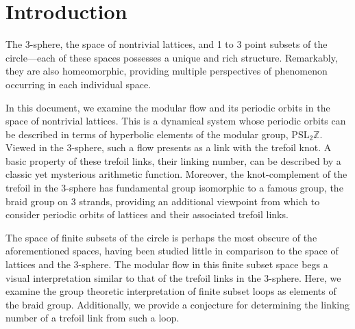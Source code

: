 \documentclass[12pt,twoside]{reedthesis}
\title{}
\author{}
\date{}
\theoremstyle{definition}
\newcommand{\Z}{\mathbb{Z}}
\newcommand{\PSLZ}{\mathrm{PSL}_2{\Z}}
\begin{document}
\maketitle
\setlength{\parskip}{0pt}
\frontmatter
\pagestyle{empty}


\tableofcontents


\setlength{\parskip}{1em}
\mainmatter
\pagestyle{fancyplain}

\chapter*{Introduction}

The 3-sphere, the space of nontrivial lattices, and 1 to 3 point subsets of the circle---each of these spaces possesses a unique and rich structure.
Remarkably, they are also homeomorphic, providing multiple perspectives of phenomenon occurring in each individual space.

In this document, we examine the modular flow and its periodic orbits in the space of nontrivial lattices.
This is a dynamical system whose periodic orbits can be described in terms of hyperbolic elements of the modular group, $\PSLZ$.
Viewed in the 3-sphere, such a flow presents as a link with the trefoil knot.
A basic property of these trefoil links, their linking number, can be described by a classic yet mysterious arithmetic function.
Moreover, the knot-complement of the trefoil in the 3-sphere has fundamental group isomorphic to a famous group, the braid group on 3 strands, providing an additional viewpoint from which to consider periodic orbits of lattices and their associated trefoil links.

The space of finite subsets of the circle is perhaps the most obscure of the aforementioned spaces, having been studied little in comparison to the space of lattices and the 3-sphere.
The modular flow in this finite subset space begs a visual interpretation similar to that of the trefoil links in the 3-sphere.
Here, we examine the group theoretic interpretation of finite subset loops as elements of the braid group.
Additionally, we provide a conjecture for determining the linking number of a trefoil link from such a loop.
\end{document}
